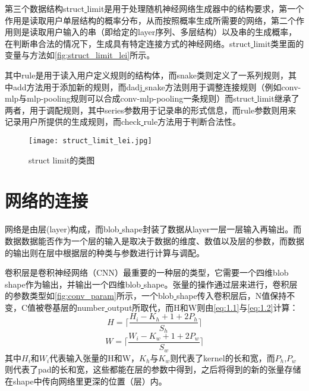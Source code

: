 第三个数据结构struct\underline{ }limit是用于处理随机神经网络生成器中的结构要求，第一个作用是读取用户单层结构的概率分布，从而按照概率生成所需要的网络，第二个作用则是读取用户输入的串（即给定的layer序列、多层结构）以及串的生成概率，在判断串合法的情况下，生成具有特定连接方式的神经网络。struct\underline{ }limit类里面的变量与方法如\autoref{fig:struct_limit_lei}所示。

其中rule是用于读入用户定义规则的结构体，而snake类则定义了一系列规则，其中add方法用于添加新的规则，而dadj\underline{ }snake方法则用于调整连接规则（例如conv-mlp与mlp-pooling规则可以合成conv-mlp-pooling一条规则）而struct\underline{ }limit继承了两者，用于调配规则，其中series参数用于记录串的形式信息，而rule参数则用来记录用户所提供的生成规则，而check\underline{ }rule方法用于判断合法性。

\begin{figure}[!htbp]
\centering
\texttt{[image: struct\_limit\_lei.jpg]}
\caption{struct limit的类图}
\label{fig:struct_limit_lei}
\end{figure}

\section{网络的连接}
网络是由层(layer)构成，而blob\underline{ }shape封装了数据从layer一层一层输入再输出。而数据数据能否作为一个层的输入是取决于数据的维度、数值以及层的参数，而数据的输出则在层中根据层的种类与参数进行计算与调配。

卷积层是卷积神经网络（CNN）最重要的一种层的类型，它需要一个四维blob\underline{ }shape作为输出，并输出一个四维blob\underline{ }shape。张量的操作通过层来进行，卷积层的参数类型如\autoref{fig:conv_param}所示，一个blob\underline{ }shape传入卷积层后，N值保持不变，C值被卷基层的number\underline{ }output所取代，而H和W则由\autoref{eq:1.1}与\autoref{eq:1.2}计算：
\begin{equation}\label{eq:1.1}
H=\lceil \frac{H_{i}-K_h+1+2P_{h}}{S_{h}}\rceil
\end{equation}
\begin{equation}\label{eq:1.2}
W=\lceil \frac{W_{i}-K_w+1+2P_{w}}{S_{w}}\rceil
\end{equation}
其中$H_{i}$和$W_{i}$代表输入张量的H和W，$K_h$与$K_w$则代表了kernel的长和宽，而$P_h$,$P_w$则代表了pad的长和宽，这些都能在层的参数中得到，之后将得到的新的张量存储在shape中传向网络里更深的位置（层）内。

